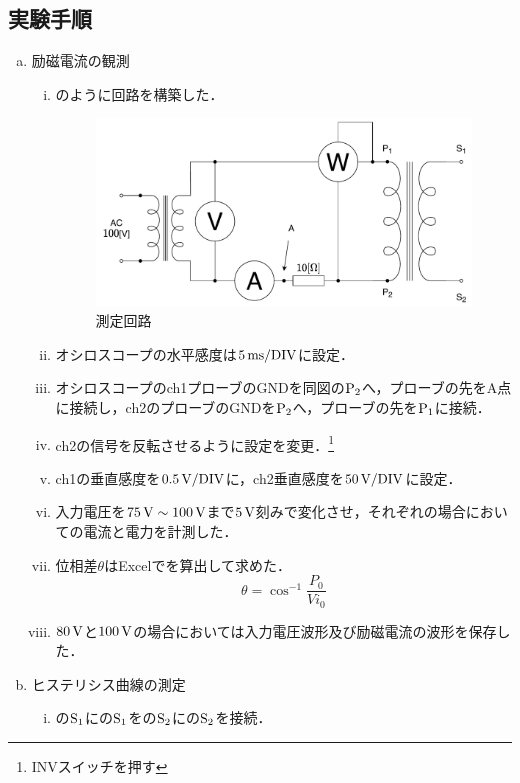 \subsection{実験手順}
\begin{enumerate}[(a)]
	\item 励磁電流の観測
	\begin{enumerate}[i)]
	\item {}のように回路を構築した．
	\begin{figure}[h]
	\centering
	\includegraphics[scale=0.8]{./fig/circ.pdf}
	\caption{測定回路}
	\label{fig:circ}
	\end{figure}
	\item オシロスコープの水平感度は$5\,\rm{ms/DIV}$に設定．
	\item オシロスコープのch1プローブのGNDを同図の$\rm{P_{2}}$へ，プローブの先をA点に接続し，ch2のプローブのGNDを$\rm{P_{2}}$へ，プローブの先を$\rm{P_{1}}$に接続．
	\item ch2の信号を反転させるように設定を変更．\footnote{INVスイッチを押す}
	\item ch1の垂直感度を$0.5\,\rm{V/DIV}$に，ch2垂直感度を$50\,\rm{V/DIV}$に設定．
	\item 入力電圧を$75\,\rm{V}\sim 100\,\rm{V}$まで$5\,\rm{V}$刻みで変化させ，それぞれの場合においての電流と電力を計測した．
	\item 位相差$\theta$はExcelでを算出して求めた．
	\begin{equation}
		\theta=\cos^{-1}\frac{P_{0}}{Vi_{0}}
		\label{eq:siki}
	\end{equation}
	\item $80\,\rm{V}$と$100\,\rm{V}$の場合においては入力電圧波形及び励磁電流の波形を保存した．
\end{enumerate}
\item ヒステリシス曲線の測定
\begin{enumerate}[i)]
	\item {}の$\rm{S_{1}}$にの$\rm{S_{1}}$をの$\rm{S_{2}}$にの$\rm{S_{2}}$を接続．

\end{enumerate}
\end{enumerate}
